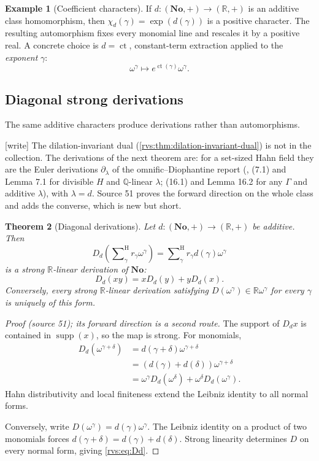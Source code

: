 \documentclass[11pt,letterpaper]{article}
\numberwithin{equation}{section}
\newtheorem{theorem}{Theorem}[section]
\theoremstyle{definition}
\newtheorem{example}[theorem]{Example}
\theoremstyle{remark}
\newcommand{\No}{\mathbf{No}}
\newcommand{\R}{\mathbb{R}}
\newcommand{\Q}{\mathbb{Q}}
\newcommand{\supp}{\operatorname{supp}}
\newcommand{\ct}{\operatorname{ct}}
\newcommand{\sH}{\mathop{\sum}\nolimits^{\mathrm H}}
\newcommand{\wtag}{\textup{[write]}}%
\begin{document}
\begin{example}[Coefficient characters]
If \(d:(\No,+)\to(\R,+)\) is an additive class homomorphism, then
\(\chi_d(\gamma)=\exp(d(\gamma))\) is a positive character.  The resulting
automorphism fixes every monomial line and rescales it by a positive real.
A concrete choice is \(d=\ct\), constant-term extraction applied to the
\emph{exponent} \(\gamma\):
\[
  \omega^\gamma\longmapsto
  e^{\ct(\gamma)}\omega^\gamma.
\]
\end{example}

\subsection{Diagonal strong derivations}\label{rvs:subsec:derivations}

The same additive characters produce derivations rather than automorphisms.

\noindent\wtag{} The dilation-invariant dual (\cref{rvs:thm:dilation-invariant-dual})
is not in the collection.  The derivations of the next theorem are: for a
set-sized Hahn field they are the Euler derivations \(\partial_\lambda\) of the
omnific--Diophantine report (,
(7.1) and Lemma 7.1 for divisible \(H\) and \(\Q\)-linear \(\lambda\); (16.1)
and Lemma 16.2 for any \(\Gamma\) and additive \(\lambda\)), with
\(\lambda=d\).  Source 51 proves the forward direction on the whole class and
adds the converse, which is new but short.


\begin{theorem}[Diagonal derivations]\label{rvs:thm:diagonal-derivation}
Let \(d:(\No,+)\to(\R,+)\) be additive.  Then
\begin{equation}\label{rvs:eq:Dd}
 D_d\!\left(\sH_\gamma r_\gamma\omega^\gamma\right)
 =\sH_\gamma r_\gamma d(\gamma)\omega^\gamma
\end{equation}
is a strong \(\R\)-linear derivation of \(\No\):
\[
  D_d(xy)=xD_d(y)+yD_d(x).
\]
Conversely, every strong \(\R\)-linear derivation satisfying
\(D(\omega^\gamma)\in\R\omega^\gamma\) for every \(\gamma\) is uniquely of
this form.
\end{theorem}

\begin{proof}[Proof (source 51); its forward direction is a second route]
The support of \(D_dx\) is contained in \(\supp(x)\), so the map is strong.
For monomials,
\begin{align*}
 D_d(\omega^{\gamma+\delta})
 &=d(\gamma+\delta)\omega^{\gamma+\delta}\\
 &=(d(\gamma)+d(\delta))\omega^{\gamma+\delta}\\
 &=\omega^\gamma D_d(\omega^\delta)
   +\omega^\delta D_d(\omega^\gamma).
\end{align*}
Hahn distributivity and local finiteness extend the Leibniz identity to all
normal forms.

Conversely, write
\(D(\omega^\gamma)=d(\gamma)\omega^\gamma\).  The Leibniz identity on a
product of two monomials forces
\(d(\gamma+\delta)=d(\gamma)+d(\delta)\).  Strong linearity determines \(D\)
on every normal form, giving \eqref{rvs:eq:Dd}.
\end{proof}
\end{document}
